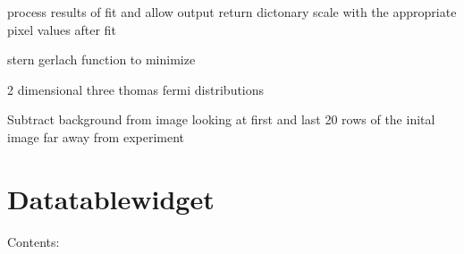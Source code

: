 \documentclass[letterpaper,10pt,english]{sphinxmanual}
\begin{document}
\begin{fulllineitems}
\begin{fulllineitems}
\begin{quote}
\begin{description}
\begin{itemize}
\end{itemize}

\end{description}\end{quote}

\end{fulllineitems}


\begin{fulllineitems}
\label{fit_object:Fitobject.fit_object.process_results}
process results of fit and allow output return dictonary
scale with the appropriate pixel values after fit

\end{fulllineitems}


\begin{fulllineitems}
\label{fit_object:Fitobject.fit_object.sg2min}
stern gerlach function to minimize

\end{fulllineitems}


\begin{fulllineitems}
\label{fit_object:Fitobject.fit_object.stern_gerlach_2D}
2 dimensional three thomas fermi distributions

\end{fulllineitems}


\begin{fulllineitems}
\label{fit_object:Fitobject.fit_object.subtract_background}
Subtract background from image looking at first and last 20
rows of the inital image far away from experiment

\end{fulllineitems}


\end{fulllineitems}



\section{Datatablewidget}
\label{Datatablewidget::doc}\label{Datatablewidget:datatablewidget}
Contents:
\end{document}
